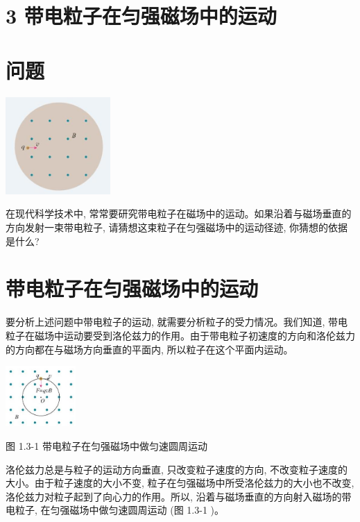 \documentclass[10pt]{article}
\begin{document}
\section*{3 带电粒子在匀强磁场中的运动}

\section*{问题}

\begin{center}
\includegraphics[max width=0.3\textwidth]{images/01910e72-c5b7-7ed5-a6d4-fb3a5faefc32_18_600709.jpg}
\end{center}

在现代科学技术中, 常常要研究带电粒子在磁场中的运动。如果沿着与磁场垂直的方向发射一束带电粒子, 请猜想这束粒子在匀强磁场中的运动径迹, 你猜想的依据是什么?

\section*{带电粒子在匀强磁场中的运动}

要分析上述问题中带电粒子的运动, 就需要分析粒子的受力情况。我们知道, 带电粒子在磁场中运动要受到洛伦兹力的作用。由于带电粒子初速度的方向和洛伦兹力的方向都在与磁场方向垂直的平面内, 所以粒子在这个平面内运动。

\begin{center}
\includegraphics[max width=0.2\textwidth]{images/01910e72-c5b7-7ed5-a6d4-fb3a5faefc32_18_493803.jpg}
\end{center}

图 1.3-1 带电粒子在匀强磁场中做匀速圆周运动

洛伦兹力总是与粒子的运动方向垂直, 只改变粒子速度的方向, 不改变粒子速度的大小。由于粒子速度的大小不变, 粒子在匀强磁场中所受洛伦兹力的大小也不改变, 洛伦兹力对粒子起到了向心力的作用。所以, 沿着与磁场垂直的方向射入磁场的带电粒子, 在匀强磁场中做匀速圆周运动 (图 1.3-1 )。
\end{document}
